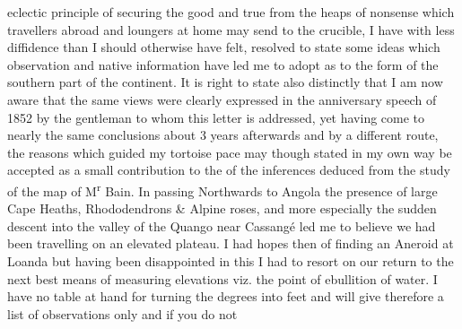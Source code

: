 \documentclass[11pt,twoside]{article}\makeatletter
\def\gap{}
\begin{document}
eclectic  \newline principle of securing the good and true  \newline from the heaps of nonsense which  \newline travellers abroad and loungers at home  \newline may send to the crucible, I have with  \newline less diffidence than I should otherwise  \newline have felt, resolved to state some ideas  \newline which observation and native information  \newline have led me to adopt as to the form of  \newline the southern part of the continent. It is  \newline right to state also distinctly that I am  \newline now aware that the same views were  \newline clearly expressed in the anniversary speech  \newline of 1852 by the gentleman to whom this  \newline letter is addressed, yet having come to  \newline nearly the same conclusions about 3 years  \newline afterwards and by a different route, the  \newline reasons which guided my tortoise pace  \newline may though stated in my own way be  \newline accepted as a small contribution to the {\newline \newline \noindent [0003]}  \newline [...] {\gap }of the inferences deduced from the  \newline study of the map of M\textsuperscript{r} Bain. \newline  \indent In passing Northwards to Angola the  \newline presence of large Cape Heaths, Rhododendrons \&  \newline Alpine roses, and more especially the sudden  \newline descent into the valley of the Quango near  \newline Cassangé led me to believe we had been  \newline travelling on an elevated plateau. I had hopes  \newline then of finding an Aneroid at Loanda but  \newline having been disappointed in this I had to  \newline resort on our return to the next best means  \newline of measuring elevations viz. the point of  \newline ebullition of water. I have no table at  \newline hand for turning the degrees into feet and  \newline will give therefore a list of observations only  \newline and if you do not 
\end{document}
